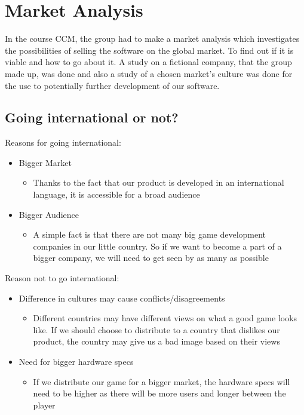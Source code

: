 \section{Market Analysis}
	In the course CCM, the group had to make a market analysis which
   investigates the possibilities of selling the software on the global
   market. To find out if it is viable and how to go about it. A study
    on a fictional company, that the group made up, was done and also a
     study of a chosen market’s culture was done for the use to potentially
      further development of our software.
	\\
	\subsection{Going international or not?}
	Reasons for going international:
	\begin{itemize}
		\item Bigger Market
		\begin{itemize}
			\item Thanks to the fact that our product is developed in an
       international language, it is accessible for a broad audience
		\end{itemize}
		\item Bigger Audience
		\begin{itemize}
			\item A simple fact is that there are not many big game development
       companies in our little country. So if we want to become a part of
        a bigger company, we will need to get seen by as many as possible
		\end{itemize}
	\end{itemize}
	Reason not to go international:
	\begin{itemize}
		\item Difference in cultures may cause conflicts/disagreements
		\begin{itemize}
			\item Different countries may have different views on what a good game
       looks like. If we should choose to distribute to a country that
        dislikes our product, the country may give us a bad image based
         on their views
		\end{itemize}
	\end{itemize}
	\begin{itemize}
		\item Need for bigger hardware specs
			\begin{itemize}
				\item If we distribute our game for a bigger market, the hardware
         specs will need to be higher as there will be more users and
          longer between the player
			\end{itemize}
	\end{itemize}
